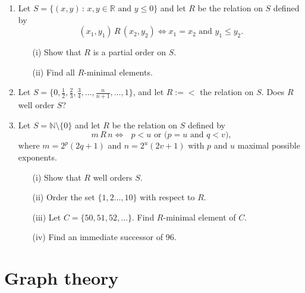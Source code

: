 \documentclass[11pt,paper=b5,footinclude,headinclude]{scrbook} %
\theoremstyle{remark}
\theoremstyle{definition} %
\theoremstyle{theorem} %
\begin{document}
\begin{enumerate}



\item Let $S=\{ (x,y) \,:\, x, y\in\mathbb{R} \textrm{ and } y\leq 0 \}$  and let $R$ be the relation on $S$ defined by 
$$(x_1,y_1)\, R\, (x_2,y_2) \Leftrightarrow  x_1 = x_2 \textrm{ and } y_1\leq y_2.$$
\begin{enumerate}
\item[(i)] Show that $R$ is a partial order on $S$.
\item[(ii)] Find all $R$-minimal elements.
\end{enumerate}



\item Let  $S= \{0,\frac{1}{2}, \frac{2}{3}, \frac{3}{4}, \ldots, \frac{n}{n+1}, \ldots, 1\}$, and let $R:=<$ the relation on $S$. Does $R$ well order $S$?


\item Let $S = \mathbb{N}\setminus \{0\}$ and let  $R$ be the relation on $S$ defined by 
$$m\, R\, n \Leftrightarrow  \textrm{ $p< u$ or ($p=u$ and $q < v$),} $$
where $m=2^p(2q+1)$ and $n=2^u(2v+1)$ with $p$ and $u$ maximal possible exponents.
\begin{enumerate}
\item[(i)] Show that $R$ well orders $S$.
\item[(ii)] Order the set  $\{1,2\ldots, 10\}$ with respect to $R$.
\item[(iii)] Let $C= \{50, 51, 52, \ldots\}$. Find $R$-minimal element of $C$.
\item[(iv)] Find an immediate successor of $96$.
\end{enumerate}



\end{enumerate}


\section{Graph theory}
\end{document}
